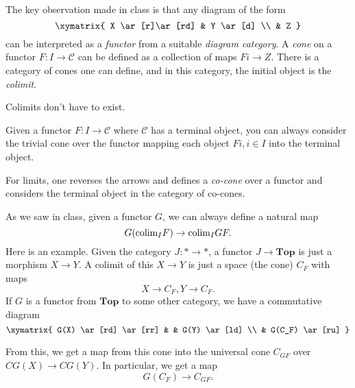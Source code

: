 The key observation made in class is that any diagram of the form \[
\xymatrix{ X \ar[r]\ar[rd] & Y \ar[d] \\ & Z } \] can be interpreted as a
\emph{functor} from a suitable \emph{diagram category}. A \emph{cone} on a
functor $F: I \to \mathcal{C}$ can be defined as a collection of maps $Fi \to
Z$. There is a category of cones one can define, and in this category, the
initial object is the \emph{colimit}.

Colimits don't have to exist.

\begin{remark} Given a functor $F: I \to \mathcal{C}$ where $\mathcal{C}$ has
a terminal object, you can always consider the trivial cone over the functor
mapping each object $Fi, i \in I$ into the terminal object. \end{remark}

For limits, one reverses the arrows and defines a \emph{co-cone} over a
functor and considers the terminal object in the category of co-cones.

As we saw in class, given a functor $G$, we can always define a natural map \[
G(\mathrm{colim}_I F) \to \mathrm{colim}_I GF. \] Here is an example. Given the category $J:
\ast \to \ast$, a functor $J \to \mathbf{Top}$ is just a morphism $X \to Y$. A
colimit of this $X \to Y$ is just a space (the cone) $C_F$ with maps \[ X \to
C_F, Y \to C_F. \] If $G$ is a functor from $\mathbf{Top}$ to some other
category, we have a commutative diagram \[ \xymatrix{ G(X) \ar[rd] \ar[rr] & &
G(Y) \ar[ld] \\ & G(C_F) \ar[ru] }\]

From this, we get a map from this cone into the universal cone $C_{GF}$ over
$CG(X) \to CG(Y)$. In particular, we get a map \[ G(C_F) \to C_{GF}. \]
